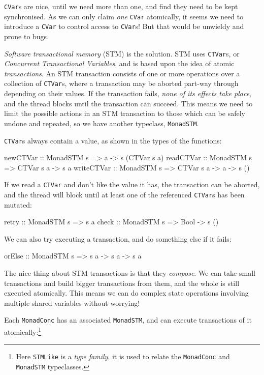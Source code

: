 \verb|CVar|s are nice, until we need more than one, and find they need
to be kept synchronised. As we can only claim \emph{one} \verb|CVar|
atomically, it seems we need to introduce a \verb|CVar| to control
access to \verb|CVar|s! But that would be unwieldy and prone to bugs.

\emph{Software transactional memory} (STM) \citep{stm} is the
solution. STM uses \verb|CTVar|s, or \emph{Concurrent Transactional
  Variables}, and is based upon the idea of atomic
\emph{transactions}. An STM transaction consists of one or more
operations over a collection of \verb|CTVar|s, where a transaction may
be aborted part-way through depending on their values. If the
transaction fails, \emph{none of its effects take place}, and the
thread blocks until the transaction can succeed. This means we need to
limit the possible actions in an STM transaction to those which can be
safely undone and repeated, so we have another typeclass,
\verb|MonadSTM|.

\verb|CTVar|s always contain a value, as shown in the types of the
functions:

\begin{haskellcode}
newCTVar   :: MonadSTM s => a -> s (CTVar s a)
readCTVar  :: MonadSTM s => CTVar s a -> s a
writeCTVar :: MonadSTM s => CTVar s a -> a -> s ()
\end{haskellcode}

If we read a \verb|CTVar| and don't like the value it has, the
transaction can be aborted, and the thread will block until at least
one of the referenced \verb|CTVar|s has been mutated:

\begin{haskellcode}
retry :: MonadSTM s => s a
check :: MonadSTM s => Bool -> s ()
\end{haskellcode}

We can also try executing a transaction, and do something else if it
fails:

\begin{haskellcode}
orElse :: MonadSTM s => s a -> s a -> s a
\end{haskellcode}

The nice thing about STM transactions is that they \emph{compose}. We
can take small transactions and build bigger transactions from them,
and the whole is still executed atomically. This means we can do
complex state operations involving multiple shared variables without
worrying!

Each \verb|MonadConc| has an associated \verb|MonadSTM|, and can
execute transactions of it atomically:\footnote{Here \texttt{STMLike}
  is a \emph{type family}, it is used to relate the \texttt{MonadConc}
  and \texttt{MonadSTM} typeclasses.}

